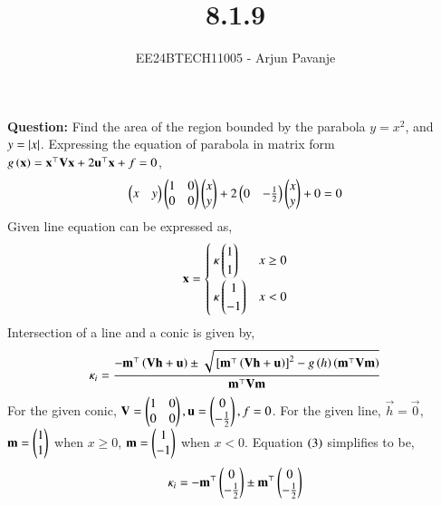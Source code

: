 \documentclass[journal]{IEEEtran}
\begin{document}

\vspace{3cm}

\title{8.1.9}
\author{EE24BTECH11005 - Arjun Pavanje}
{\let\newpage\relax\maketitle}
\textbf{Question:}
Find the area of the region bounded by the parabola $y=x^2$,  and $y=\left\vert x\right\vert$.
\solution\newline
Expressing the equation of parabola in matrix form $g\left(\mathbf{x}\right)= \mathbf{x}^{\top}\mathbf{V}\mathbf{x}+2\mathbf{u}^{\top}\mathbf{x}+f=0$,
\begin{align}
  \begin{pmatrix}x&y\end{pmatrix}\begin{pmatrix}1&0\\0&0\end{pmatrix}\begin{pmatrix}x\\y\end{pmatrix}+2\begin{pmatrix}0 & -\frac{1}{2}\end{pmatrix}\begin{pmatrix}x\\y\end{pmatrix}+0=0
\end{align}
Given line equation can be expressed as,
\begin{align}
  \mathbf{x}=
  \begin{cases}
    \kappa\begin{pmatrix}1\\1\end{pmatrix} & x\ge0\\
    \kappa\begin{pmatrix}1\\-1\end{pmatrix} & x<0
  \end{cases}
\end{align}
Intersection of a line and a conic is given by,
\begin{align}
  \kappa_i=\frac{-\mathbf{m}^{\top}\left(\mathbf{Vh}+\mathbf{u}\right)\pm\sqrt{{}\left[\mathbf{m}^{\top}\left(\mathbf{Vh}+\mathbf{u}\right)\right]^2-g\left(h\right)\left(\mathbf{m}^{\top}\mathbf{Vm}\right)}}{\mathbf{m}^{\top}\mathbf{Vm}}
\end{align}
For the given conic, $\mathbf{V}=\begin{pmatrix}1 & 0 \\ 0 & 0 \end{pmatrix}, \mathbf{u}=\begin{pmatrix}0\\-\frac{1}{2}\end{pmatrix}, f=0$. For the given line, $\vec{h}=\vec{0}$, $\mathbf{m}=\begin{pmatrix}1\\1\end{pmatrix}$ when $x\ge0$, $\mathbf{m}=\begin{pmatrix}1\\-1\end{pmatrix}$ when $x<0$.\newline
Equation $\left(3\right)$ simplifies to be,
\begin{align}
  \kappa_i=-\mathbf{m}^{\top}\begin{pmatrix}0\\-\frac{1}{2}\end{pmatrix}\pm \mathbf{m}^{\top}\begin{pmatrix}0\\-\frac{1}{2}\end{pmatrix}
\end{align}
\end{document}
